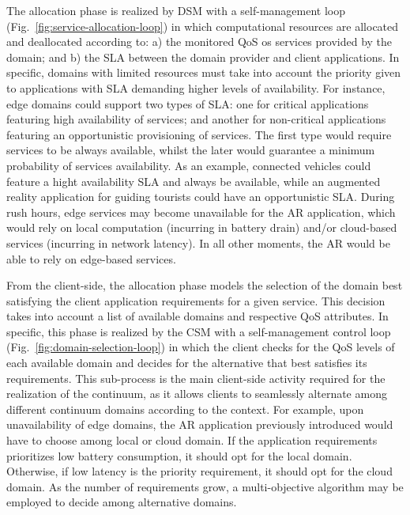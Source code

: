 The allocation phase is realized by DSM with a self-management loop~\cite{kephart2003vision} (Fig.~\ref{fig:service-allocation-loop}) in which computational resources are allocated and deallocated according to: a) the monitored QoS os services provided by the domain; and b) the SLA between the domain provider and client applications. In specific, domains with limited resources must take into account the priority given to applications with SLA demanding higher levels of availability. For instance, edge domains could support two types of SLA: one for critical applications featuring high availability of services; and another for non-critical applications featuring an opportunistic provisioning of services. The first type would require services to be always available, whilst the later would guarantee a minimum probability of services availability. As an example, connected vehicles could feature a hight availability SLA and always be available, while an augmented reality application for guiding tourists could have an opportunistic SLA. During rush hours, edge services may become unavailable for the AR application, which would rely on local computation (incurring in battery drain) and/or cloud-based services (incurring in network latency). In all other moments, the AR would be able to rely on edge-based services. 


From the client-side, the allocation phase models the selection of the domain best satisfying the client application requirements for a given service. This decision takes into account a list of available domains and respective QoS attributes. In specific, this phase is realized by the CSM with a self-management control loop (Fig.~\ref{fig:domain-selection-loop}) in which the client checks for the QoS levels of each available domain and decides for the alternative that best satisfies its requirements. This sub-process is the main client-side activity required for the realization of the continuum, as it allows clients to seamlessly alternate among different continuum domains according to the context. For example, upon unavailability of edge domains, the AR application previously introduced would have to choose among local or cloud domain. If the application requirements prioritizes low battery consumption, it should opt for the local domain. Otherwise, if low latency is the priority requirement, it should opt for the cloud domain. As the number of requirements grow, a multi-objective algorithm may be employed to decide among alternative domains.



